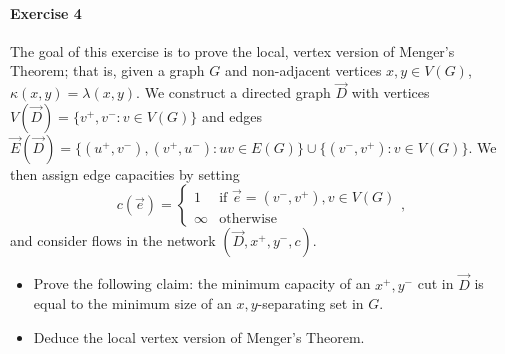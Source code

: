 \documentclass[a4paper,12pt]{article}
\begin{document}
\paragraph{Exercise 4}  The goal of this exercise is to prove the local, vertex version of Menger's Theorem; that is, given a graph $G$ and non-adjacent vertices $x, y \in V(G)$, $\kappa(x,y) = \lambda(x,y)$.  We construct a directed graph $\vec{D}$ with vertices $V(\vec{D}) = \{ v^+, v^- : v \in V(G) \}$ and edges $\vec{E}(\vec{D}) = \{ (u^+, v^-), (v^+, u^-) : uv \in E(G) \} \cup \{ (v^-, v^+) : v \in V(G) \}$.  We then assign edge capacities by setting
\[ c\left(\vec{e}\right) = \begin{cases}
	1 & \textrm{if } \vec{e} = (v^-, v^+), v \in V(G) \\
	\infty & \textrm{otherwise}
\end{cases} , \]
and consider flows in the network $(\vec{D}, x^+, y^-, c)$.

\begin{itemize}
	\item[(a)] Prove the following claim: the minimum capacity of an $x^+, y^-$ cut in $\vec{D}$ is equal to the minimum size of an $x,y$-separating set in $G$.
	\item[(b)] Deduce the local vertex version of Menger's Theorem.
\end{itemize}




\begin{center}
\end{center}
\end{document}
